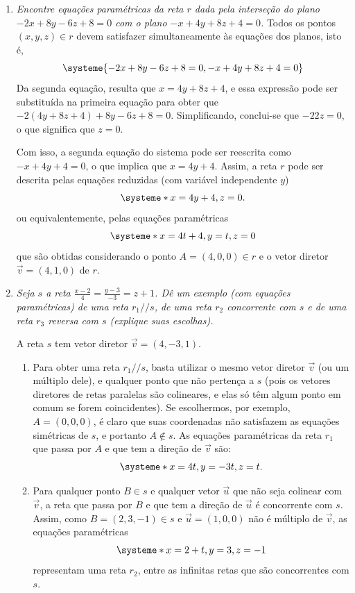 \documentclass[12pt,a4paper]{article}
\begin{document}
\begin{enumerate}
\item \textit{Encontre equações paramétricas da reta $r$ dada pela interseção do plano $-2x + 8y - 6z + 8 = 0$ com o plano $-x + 4y + 8z + 4 = 0$.}
Todos os pontos $(x, y, z) \in r$ devem satisfazer simultaneamente às equações dos planos, isto é,
\[
\systeme{
-2x + 8y - 6z + 8 = 0,
 -x + 4y + 8z + 4 = 0}
\]
Da segunda equação, resulta que $x = 4y + 8z + 4$, e essa expressão pode ser substituída na primeira equação para obter que $-2(4y + 8z + 4) + 8y - 6z + 8 = 0$. Simplificando, conclui-se que $- 22z = 0$, o que significa que $z = 0$.

Com isso, a segunda equação do sistema pode ser reescrita como $-x + 4y + 4 = 0$, o que implica que $x = 4y + 4$. Assim, a reta $r$ pode ser descrita pelas equações reduzidas (com variável independente $y$)
\[
\systeme*{
x = 4y + 4,
z = 0.
}
\]
ou equivalentemente, pelas equações paramétricas
\[
\systeme*{
x = 4t + 4,
y = t,
z = 0
}
\]
que são obtidas considerando o ponto $A = (4, 0, 0) \in r$ e o vetor diretor $\vec{v} = (4, 1, 0)$ de $r$.

\item \textit{ Seja $s$ a reta $\frac{x - 2}{4} = \frac{y - 3}{-3} = z + 1$. Dê um exemplo (com equações paramétricas) de uma reta $r_1 // s$, de uma reta $r_2$ concorrente com $s$ e de uma reta $r_3$ reversa com $s$ (explique suas escolhas). }

A reta $s$ tem vetor diretor $\vec{v} = (4,-3,1)$.
\begin{enumerate}

\item Para obter uma reta $r_1 // s$, basta utilizar o mesmo vetor diretor $\vec{v}$ (ou um múltiplo dele), e qualquer ponto que não pertença a $s$ (pois os vetores diretores de retas paralelas são colineares, e elas só têm algum ponto em comum se forem coincidentes). Se escolhermos, por exemplo, $A = (0,0,0)$, é claro que suas coordenadas não satisfazem as equações simétricas de $s$, e portanto $A \not\in s$. As equações paramétricas da reta $r_1$ que passa por $A$ e que tem a direção de $\vec{v}$ são:
\[
\systeme*{
x = 4t,
y = -3t,
z = t.
}
\]

\item Para qualquer ponto $B \in s$ e qualquer vetor $\vec{u}$ que não seja colinear com $\vec{v}$, a reta que passa por $B$ e que tem a direção de $\vec{u}$ é concorrente com $s$. Assim, como $B = (2,3,-1) \in s$ e $\vec{u} = (1,0,0)$ não é múltiplo de $\vec{v}$, as equações paramétricas
\[
\systeme*{
x = 2 + t,
y = 3,
z = -1
}
\]
representam uma reta $r_2$, entre as infinitas retas que são concorrentes com $s$.


\end{enumerate}
\end{enumerate}
\end{document}

